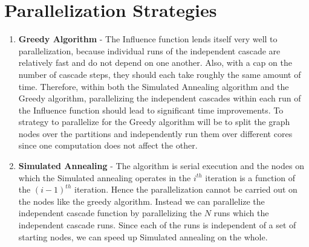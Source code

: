 \documentclass[11pt]{scrartcl} %
\begin{document}
\section{Parallelization Strategies}
\begin{enumerate}
\item \textbf{Greedy Algorithm} - The Influence function lends itself very well to parallelization, because individual runs of the independent cascade are relatively fast and do not depend on one another.  Also, with a cap on the number of cascade steps, they should each take roughly the same amount of time.  Therefore, within both the Simulated Annealing algorithm and the Greedy algorithm, parallelizing the independent cascades within each run of the Influence function should lead to significant time improvements. To strategy to parallelize for the Greedy algorithm will be to split the graph nodes over the partitions and independently run them over different cores since one computation does not affect the other.

\item \textbf{Simulated Annealing} - The algorithm is serial execution and the nodes on which the Simulated annealing operates in the $i^{th}$ iteration is a function of the $(i-1)^{th}$ iteration. Hence the parallelization cannot be carried out on the nodes like the greedy algorithm. Instead we can parallelize the independent cascade function by parallelizing the $N$ runs which the independent cascade runs. Since each of the runs is independent of a set of starting nodes, we can speed up Simulated annealing on the whole.
\end{enumerate}
\end{document}
